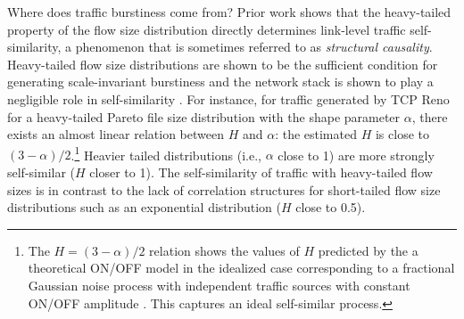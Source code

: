 
Where does traffic burstiness come from?  
Prior work \cite{filesize, park1997effect, feldmann1999dynamics} shows that the heavy-tailed property of the flow size distribution directly determines link-level traffic self-similarity, a phenomenon that is sometimes referred to as \emph{structural causality}.  Heavy-tailed flow size distributions are shown to be the sufficient condition for generating scale-invariant burstiness and the network stack is shown to play a negligible role in self-similarity \cite{filesize, feldmann1999dynamics}. 
%
For instance, for traffic generated by TCP Reno for a heavy-tailed Pareto file size distribution with the shape parameter $\alpha$, there exists an almost linear relation between $H$ and $\alpha$: the estimated $H$ is close to $(3-\alpha)/2$.\footnote{The $H=(3-\alpha)/2$ relation shows the values of $H$ predicted by the a theoretical ON/OFF model in the idealized case corresponding to a fractional Gaussian noise process with independent traffic sources with constant ON/OFF amplitude \cite{park1997effect}. This captures an ideal self-similar process.} 
Heavier tailed distributions (i.e., $\alpha$ close to 1) are more strongly self-similar ($H$ closer to 1). The self-similarity of traffic with heavy-tailed flow sizes is in contrast to the lack of correlation structures for short-tailed flow size distributions such as an exponential distribution ($H$ close to 0.5).

